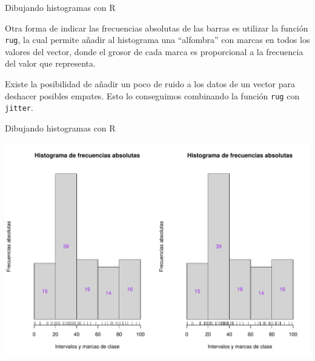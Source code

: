 \documentclass[
  ignorenonframetext,
]{beamer}
\begin{document}
\begin{frame}[fragile]{Dibujando histogramas con R}
\protect\hypertarget{dibujando-histogramas-con-r-5}{}

Otra forma de indicar las frecuencias absolutas de las barras es
utilizar la función \texttt{rug}, la cual permite añadir al histograma
una ``alfombra'' con marcas en todos los valores del vector, donde el
grosor de cada marca es proporcional a la frecuencia del valor que
representa.

Existe la posibilidad de añadir un poco de ruido a los datos de un
vector para deshacer posibles empates. Esto lo conseguimos combinando la
función \texttt{rug} con \texttt{jitter}.

\end{frame}

\begin{frame}{Dibujando histogramas con R}
\protect\hypertarget{dibujando-histogramas-con-r-6}{}

\includegraphics{Tema9.-Agrupacion_datos_cuantitativos_files/figure-beamer/unnamed-chunk-45-1.pdf}

\end{frame}
\end{document}
